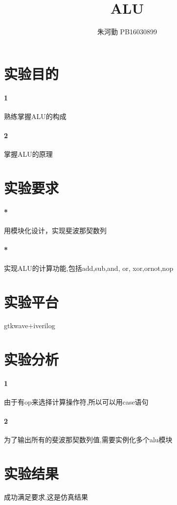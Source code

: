 \documentclass[UTF8]{ctexart}
\title{ALU}
\author{朱河勤   PB16030899}
\begin{document}
\maketitle
\tableofcontents

\section{实验目的}

\paragraph{1}熟练掌握ALU的构成

\paragraph{2}掌握ALU的原理

\section{实验要求}
\paragraph{*}用模块化设计，实现斐波那契数列
\paragraph{*}实现ALU的计算功能,包括add,sub,and, or,
xor,ornot,nop

\section{实验平台}
gtkwave+iverilog



\section{实验分析}
\paragraph{1}由于有op来选择计算操作符,所以可以用case语句
\paragraph{2}为了输出所有的斐波那契数列值,需要实例化多个alu模块

\section{实验结果}
成功满足要求,这是仿真结果
\end{document}
